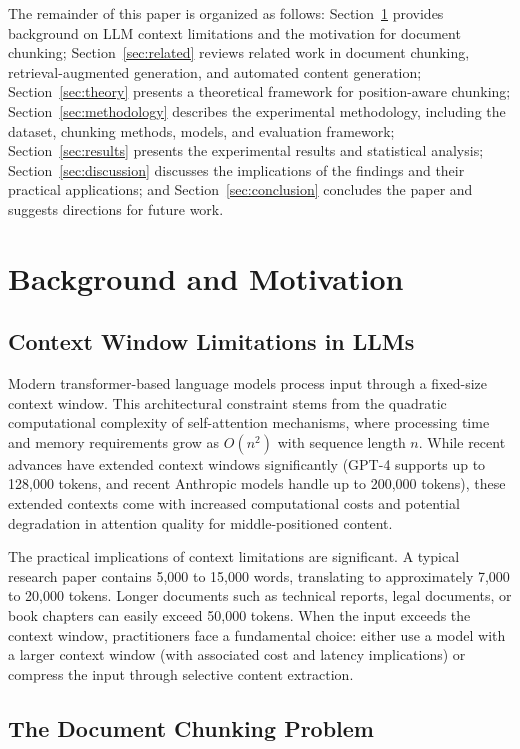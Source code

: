 \documentclass{ieeeaccess}
\begin{document}
The remainder of this paper is organized as follows: Section~\ref{sec:background} provides background on LLM context limitations and the motivation for document chunking; Section~\ref{sec:related} reviews related work in document chunking, retrieval-augmented generation, and automated content generation; Section~\ref{sec:theory} presents a theoretical framework for position-aware chunking; Section~\ref{sec:methodology} describes the experimental methodology, including the dataset, chunking methods, models, and evaluation framework; Section~\ref{sec:results} presents the experimental results and statistical analysis; Section~\ref{sec:discussion} discusses the implications of the findings and their practical applications; and Section~\ref{sec:conclusion} concludes the paper and suggests directions for future work.

\section{Background and Motivation}
\label{sec:background}

\subsection{Context Window Limitations in LLMs}

Modern transformer-based language models process input through a fixed-size context window. This architectural constraint stems from the quadratic computational complexity of self-attention mechanisms, where processing time and memory requirements grow as $O(n^2)$ with sequence length $n$. While recent advances have extended context windows significantly (GPT-4 supports up to 128,000 tokens, and recent Anthropic models handle up to 200,000 tokens), these extended contexts come with increased computational costs and potential degradation in attention quality for middle-positioned content.

The practical implications of context limitations are significant. A typical research paper contains 5,000 to 15,000 words, translating to approximately 7,000 to 20,000 tokens. Longer documents such as technical reports, legal documents, or book chapters can easily exceed 50,000 tokens. When the input exceeds the context window, practitioners face a fundamental choice: either use a model with a larger context window (with associated cost and latency implications) or compress the input through selective content extraction.

\subsection{The Document Chunking Problem}
\end{document}
